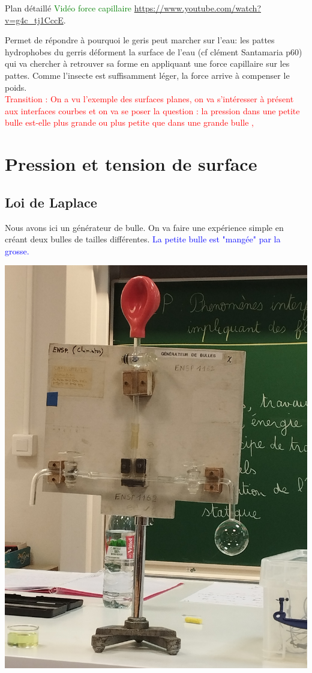 \begin{reportBlock}{Plan détaillé}
  \textcolor{green}{Vidéo force capillaire }\url{https://www.youtube.com/watch?v=g4c_tj1CccE}.
  
  Permet de répondre à pourquoi le geris peut marcher sur l'eau: les pattes hydrophobes du gerris déforment la surface de l'eau (cf clément Santamaria p60) qui va chercher à retrouver sa forme en appliquant une force capillaire sur les pattes. Comme l'insecte est suffisamment léger, la force arrive à compenser le poids. \\

  \textcolor{red}{Transition : On a vu l'exemple des surfaces planes, on va s'intéresser à présent aux interfaces courbes et on va se poser la question : la pression dans une petite bulle est-elle plus grande ou plus petite que dans une grande bulle ,}
  
 \section{Pression et tension de surface}
 
 \subsection{Loi de Laplace}
 Nous avons ici un générateur de bulle. On va faire une expérience simple en créant deux bulles de tailles différentes. \textcolor{blue}{La petite bulle est "mangée" par la grosse.}
 \begin{center}
     \includegraphics[scale=0.1]{LP_TensionSurface/Manip_Laplace.jpg}
     

\end{center}
\end{reportBlock}
